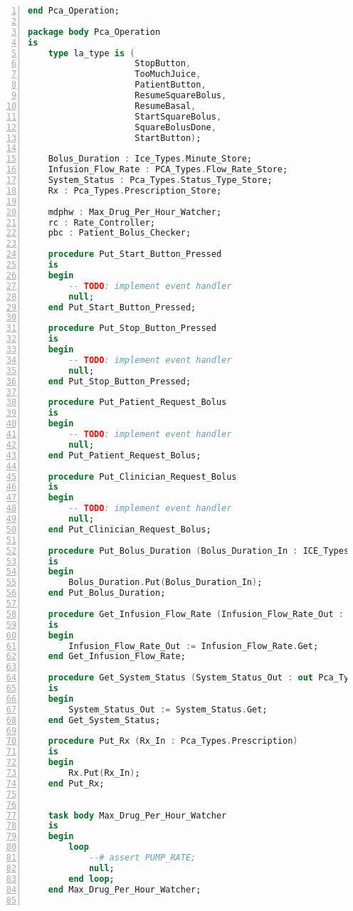 \begin{lstlisting}[language=ada, gobble=0, numbers=left, caption={\lstinline{Pca_Operation} package}, label={listing:pca_generated:pca_operation}]
end Pca_Operation;

package body Pca_Operation
is
    type la_type is (
                     StopButton,
                     TooMuchJuice,
                     PatientButton,
                     ResumeSquareBolus,
                     ResumeBasal,
                     StartSquareBolus,
                     SquareBolusDone,
                     StartButton);

    Bolus_Duration : Ice_Types.Minute_Store;
    Infusion_Flow_Rate : PCA_Types.Flow_Rate_Store;
    System_Status : Pca_Types.Status_Type_Store;
    Rx : Pca_Types.Prescription_Store;

    mdphw : Max_Drug_Per_Hour_Watcher;
    rc : Rate_Controller;
    pbc : Patient_Bolus_Checker;

    procedure Put_Start_Button_Pressed
    is
    begin
        -- TODO: implement event handler
        null;
    end Put_Start_Button_Pressed;

    procedure Put_Stop_Button_Pressed
    is
    begin
        -- TODO: implement event handler
        null;
    end Put_Stop_Button_Pressed;

    procedure Put_Patient_Request_Bolus
    is
    begin
        -- TODO: implement event handler
        null;
    end Put_Patient_Request_Bolus;

    procedure Put_Clinician_Request_Bolus
    is
    begin
        -- TODO: implement event handler
        null;
    end Put_Clinician_Request_Bolus;

    procedure Put_Bolus_Duration (Bolus_Duration_In : ICE_Types.Minute)
    is
    begin
        Bolus_Duration.Put(Bolus_Duration_In);
    end Put_Bolus_Duration;

    procedure Get_Infusion_Flow_Rate (Infusion_Flow_Rate_Out : out Pca_Types.Flow_Rate)
    is
    begin
        Infusion_Flow_Rate_Out := Infusion_Flow_Rate.Get;
    end Get_Infusion_Flow_Rate;

    procedure Get_System_Status (System_Status_Out : out Pca_Types.Status_Type)
    is
    begin
        System_Status_Out := System_Status.Get;
    end Get_System_Status;

    procedure Put_Rx (Rx_In : Pca_Types.Prescription)
    is
    begin
        Rx.Put(Rx_In);
    end Put_Rx;


    task body Max_Drug_Per_Hour_Watcher
    is
    begin
        loop
            --# assert PUMP_RATE;
            null;
        end loop;
    end Max_Drug_Per_Hour_Watcher;


\end{lstlisting}
